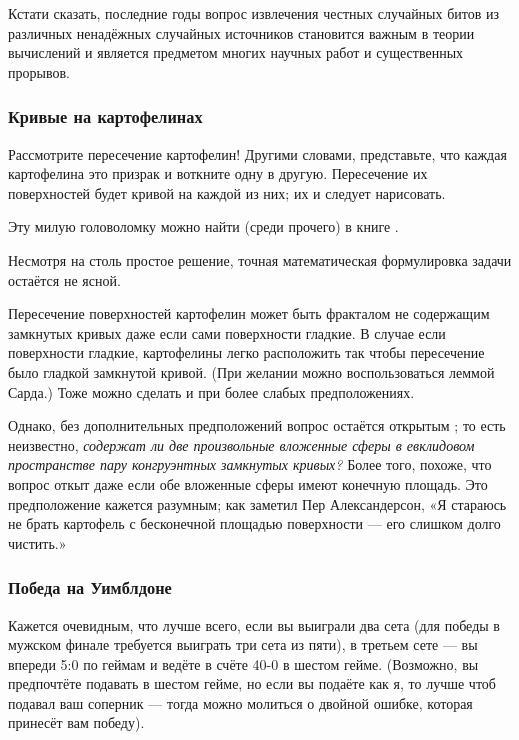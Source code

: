 Кстати сказать, последние годы вопрос извлечения честных %
случайных битов из различных ненадёжных случайных источников становится важным в теории вычислений и является предметом многих научных работ и существенных прорывов.

\subsubsection*{Кривые на картофелинах}

Рассмотрите пересечение картофелин!
Другими словами, представьте, что каждая картофелина это призрак и воткните одну в другую.
Пересечение их поверхностей будет кривой на каждой из них; их и следует нарисовать.

Эту милую головоломку можно найти (среди прочего) в книге \cite{5}.

\begin{addedbytheeditors}
Несмотря на столь простое решение, точная математическая формулировка задачи остаётся не ясной.

Пересечение поверхностей картофелин может быть фракталом не содержащим замкнутых кривых даже если сами поверхности гладкие.
В случае если поверхности гладкие, картофелины легко расположить так чтобы пересечение было гладкой замкнутой кривой.
(При желании можно воспользоваться леммой Сарда.)
Тоже можно сделать и при более слабых предположениях.

Однако, без дополнительных предположений вопрос остаётся открытым \cite{agol};
то есть неизвестно, \emph{содержат ли две произвольные вложенные сферы в евклидовом пространстве пару конгруэнтных замкнутых кривых?} 
Более того, похоже, что вопрос откыт даже если обе вложенные сферы имеют конечную площадь.
Это предположение кажется разумным; как заметил Пер Александерсон,
«Я стараюсь не брать картофель с бесконечной площадью поверхности --- его слишком долго чистить.»
\end{addedbytheeditors}

\subsubsection*{Победа на Уимблдоне}

Кажется очевидным, что лучше всего, если вы выиграли два сета (для победы в
мужском финале требуется выиграть три сета из пяти), в третьем сете --- вы впереди 5:0 по
геймам и ведёте в счёте 40-0 в шестом гейме.
(Возможно, вы предпочтёте подавать в шестом гейме, но если вы подаёте как я, то лучше чтоб подавал ваш соперник --- тогда можно молиться о двойной ошибке, которая принесёт вам победу).


